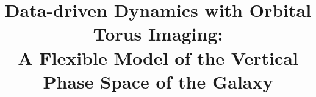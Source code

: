 


\documentclass[modern]{aastex631}

\usepackage{microtype}  %
\usepackage{amsmath}
\usepackage{amsfonts}
\usepackage{amssymb}
\usepackage{booktabs}
\usepackage{graphicx}

\usepackage{enumitem}

\setlength{\parindent}{1.1\baselineskip}
\addtolength{\topmargin}{-0.2in}
\addtolength{\textheight}{0.4in}
\sloppy\sloppypar\raggedbottom\frenchspacing

\graphicspath{{figures/}}


\newcommand{\freqzero}{\ensuremath{\Omega_0}}
\newcommand{\mmax}{\ensuremath{M}}
\newcommand{\rz}{\ensuremath{r_z}}
\newcommand{\rzp}{\ensuremath{\tilde{r}_z}}
\newcommand{\thz}{\ensuremath{\theta_z}}
\newcommand{\thzp}{\ensuremath{\tilde{\theta}_z}}

\shorttitle{}



\title{
    Data-driven Dynamics with Orbital Torus Imaging:  \\
    A Flexible Model of the Vertical Phase Space of the Galaxy
}

\newcommand{\affcca}{
    Center for Computational Astrophysics, Flatiron Institute, \\
    162 Fifth Ave, New York, NY 10010, USA
}

